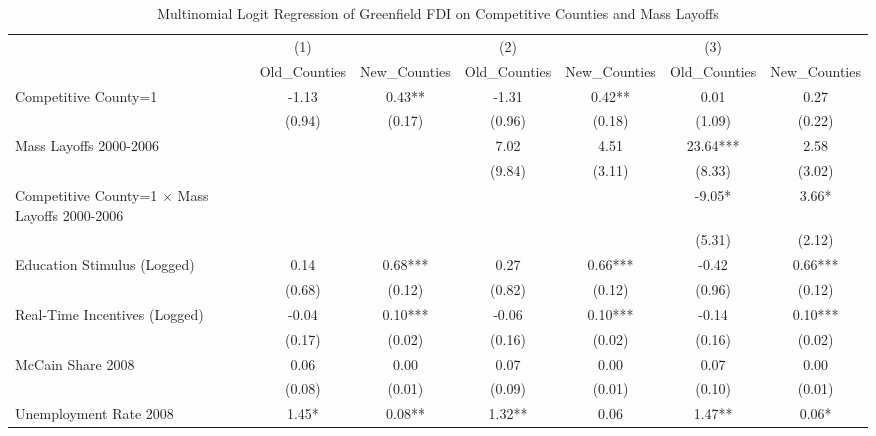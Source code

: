 \begin{table}[!htbp]\centering
\def\sym#1{\ifmmode^{#1}\else\(^{#1}\)\fi}
\caption{Multinomial Logit Regression of Greenfield FDI on Competitive Counties and Mass Layoffs}
\begin{tabular}{l*{6}{c}}
\hline\hline
                    &         (1)   &               &         (2)   &               &         (3)   &               \\
                    &Old_Counties   &New_Counties   &Old_Counties   &New_Counties   &Old_Counties   &New_Counties   \\
\hline
Competitive County=1&       -1.13   &        0.43** &       -1.31   &        0.42** &        0.01   &        0.27   \\
                    &      (0.94)   &      (0.17)   &      (0.96)   &      (0.18)   &      (1.09)   &      (0.22)   \\
Mass Layoffs 2000-2006&               &               &        7.02   &        4.51   &       23.64***&        2.58   \\
                    &               &               &      (9.84)   &      (3.11)   &      (8.33)   &      (3.02)   \\
Competitive County=1 $\times$ Mass Layoffs 2000-2006&               &               &               &               &       -9.05*  &        3.66*  \\
                    &               &               &               &               &      (5.31)   &      (2.12)   \\
Education Stimulus (Logged)&        0.14   &        0.68***&        0.27   &        0.66***&       -0.42   &        0.66***\\
                    &      (0.68)   &      (0.12)   &      (0.82)   &      (0.12)   &      (0.96)   &      (0.12)   \\
Real-Time Incentives (Logged)&       -0.04   &        0.10***&       -0.06   &        0.10***&       -0.14   &        0.10***\\
                    &      (0.17)   &      (0.02)   &      (0.16)   &      (0.02)   &      (0.16)   &      (0.02)   \\
McCain Share 2008   &        0.06   &        0.00   &        0.07   &        0.00   &        0.07   &        0.00   \\
                    &      (0.08)   &      (0.01)   &      (0.09)   &      (0.01)   &      (0.10)   &      (0.01)   \\
Unemployment Rate 2008 &        1.45*  &        0.08** &        1.32** &        0.06   &        1.47** &        0.06*  \\

\end{tabular}
\end{table}
